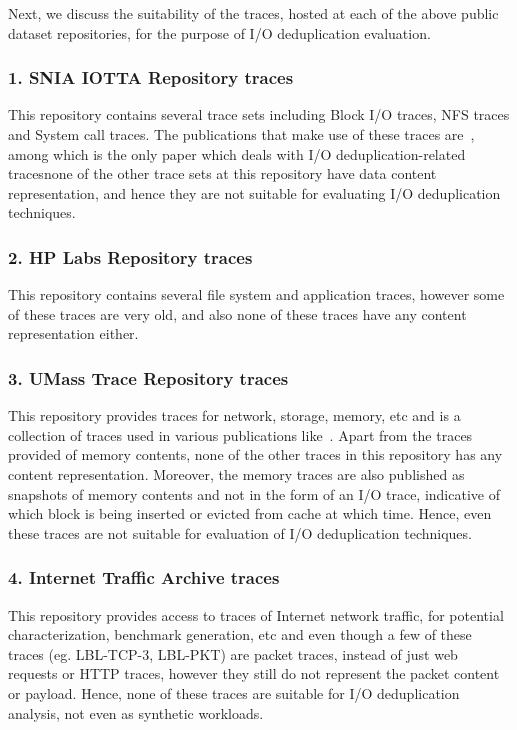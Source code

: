 Next, we discuss the suitability of the traces, hosted at 
each of the above public dataset repositories, 
for the purpose of I/O deduplication evaluation.

\subsubsection{1. SNIA IOTTA Repository traces}
This repository contains several trace sets including Block I/O traces, NFS 
traces and System call traces. The publications that make use of these 
traces are~\cite{flexi-replay, iodedup, animation-nfs, winservers, metadata-evolution, tracefs}, among which \cite{iodedup} is the only paper which deals
with I/O deduplication-related traces\textemdash{}none of the other trace sets at
this repository have data content representation, and hence they are not
suitable for evaluating I/O deduplication techniques.

\subsubsection{2. HP Labs Repository traces}
This repository contains several file system and application traces, however
some of these traces are very old, and also none of these traces have any
content representation either.

\subsubsection{3. UMass Trace Repository traces}
This repository provides traces for network, storage, memory, etc and is a 
collection of traces used in various publications like~\cite{flexi-replay, 
intradisk-parallelism, memorybuddies}. Apart from the traces provided 
of memory contents, none of the other traces in this repository has any
content representation. Moreover, the memory traces are also published 
as snapshots of memory contents and not in the form of an I/O trace, 
indicative of which block is being inserted or evicted from cache at 
which time. Hence, even these traces are not suitable for evaluation of
I/O deduplication techniques.

\subsubsection{4. Internet Traffic Archive traces}
This repository provides access to traces of Internet network traffic, for
potential characterization, benchmark generation, etc and even though
a few of these traces (eg. LBL-TCP-3, LBL-PKT) are packet traces, instead
of just web requests or HTTP traces, however they still do not represent
the packet content or payload. Hence, none of these traces are suitable
for I/O deduplication analysis, not even as synthetic workloads.

